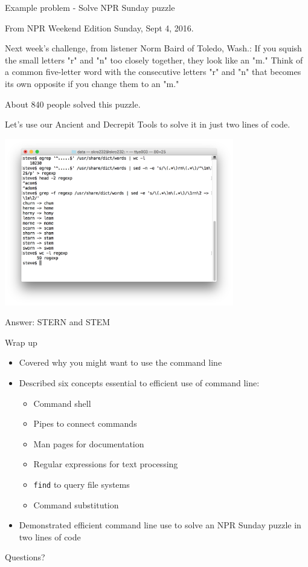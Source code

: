 \documentclass[t]{beamer}
\begin{document}
\begin{frame}{Example problem - Solve NPR Sunday puzzle}

  From NPR Weekend Edition Sunday, Sept 4, 2016.

  \bigskip
  Next week's challenge, from listener Norm Baird of Toledo, Wash.: If
  you squish the small letters "r" and "n" too closely together, they
  look like an "m." Think of a common five-letter word with the
  consecutive letters "r" and "n" that becomes its own opposite if you
  change them to an "m."
  
  \bigskip
  About 840 people solved this puzzle.
  
  \bigskip
  Let's use our Ancient and Decrepit Tools to solve it in just two
  lines of code.
  \note{}
\end{frame}

\begin{frame}{}
  \includegraphics[width=10cm,scale=0.4]{images/puzzle.png}

  Answer: STERN and STEM
  \note{}
\end{frame}

\begin{frame}{Wrap up}
  \begin{itemize}
  \item Covered why you might want to use the command line
    \pause
  \item Described six concepts essential to efficient use of command
    line:
    \begin{itemize}
    \item Command shell
    \pause
    \item Pipes to connect commands
    \pause
    \item Man pages for documentation
    \pause
    \item Regular expressions for text processing
    \pause
    \item \texttt{find} to query file systems
    \pause
    \item Command substitution
    \end{itemize}
    \pause
  \item Demonstrated efficient command line use to solve an NPR Sunday puzzle
    in two lines of code
  \end{itemize}
  \note{}
\end{frame}

\begin{frame}{Questions?}
  \note{}
\end{frame}
\end{document}
